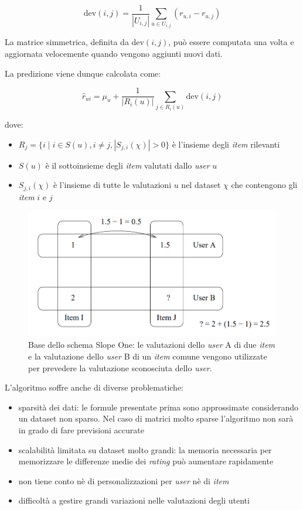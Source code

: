 \[
    \text{dev}(i, j) = \frac{1}{|U_{i,j}|} \sum\limits_{u \in U_{i,j}} (r_{u,i} - r_{u,j})
\]

La matrice simmetrica, definita da $\text{dev}(i, j)$, può essere computata una volta e aggiornata velocemente quando vengono aggiunti nuovi dati.

La predizione viene dunque calcolata come:

\[
    \hat{r}_{ui} = \mu_u + \frac{1}{|R_i(u)|} \sum\limits_{j \in R_i(u)} \text{dev}(i, j)
\]

dove:

\begin{itemize}
    \item $R_j = \{ i \mid i \in S(u), i \neq j, |S_{j,i}(\chi)| > 0 \}$ è l'insieme degli \textit{item} rilevanti
    \item $S(u)$ è il sottoinsieme degli \textit{item} valutati dallo \textit{user} $u$
    \item $S_{j,i}(\chi)$ è l'insieme di tutte le valutazioni $u$ nel dataset $\chi$ che contengono gli \textit{item} $i$ e $j$
\end{itemize}

\begin{figure}[htbp]
    \centering
    \includegraphics[keepaspectratio]{figures/algorithms/slope_one.PNG}
    \caption{Base dello schema Slope One: le valutazioni dello \textit{user} A di due \textit{item} e la valutazione  dello \textit{user} B di un \textit{item} comune vengono utilizzate per prevedere la valutazione sconosciuta dello \textit{user}.}
    \label{fig:slopeone}
\end{figure}

L'algoritmo soffre anche di diverse problematiche:
\begin{itemize}
    \item sparsità dei dati: le formule presentate prima sono approssimate considerando un dataset non sparso. Nel caso di matrici molto sparse l'algoritmo non sarà in grado di fare previsioni accurate
    \item scalabilità limitata su dataset molto grandi: la memoria necessaria per memorizzare le differenze medie dei \textit{rating} può aumentare rapidamente
    \item non tiene conto nè di personalizzazioni per \textit{user} nè di \textit{item}
    \item difficoltà a gestire grandi variazioni nelle valutazioni degli utenti
\end{itemize}

